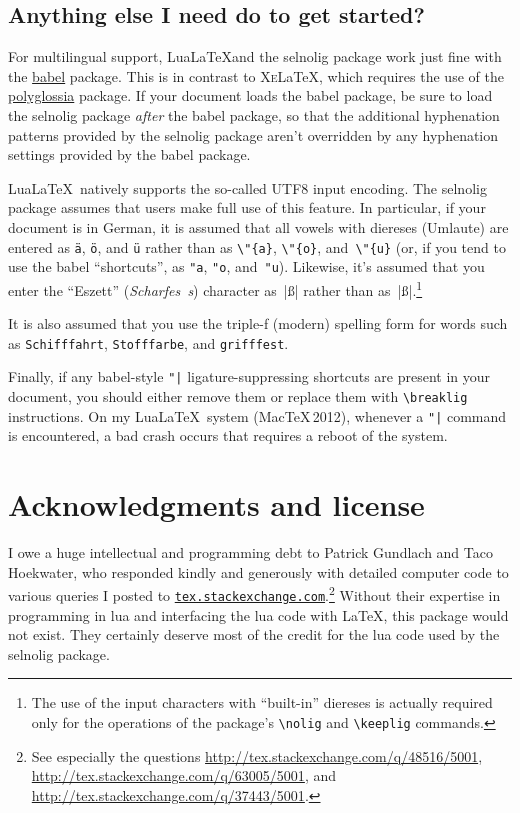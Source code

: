 \documentclass[12pt]{article}
\newcommand{\pkg}[1]{\textsf{#1}}
\newcommand{\cmmd}[1]{\texttt{\textbackslash #1}}
\begin{document}
\subsection{Anything else I need do to get started?} \label{sec:anythingelse}

For multilingual support, Lua\LaTeX and the \pkg{selnolig} package work just fine with the \href{http://www.ctan.org/pkg/babel}{\pkg{babel}} package. This is in contrast to X\textsc{e}\LaTeX, which requires the use of the \href{http://www.ctan.org/pkg/polyglossia}{\pkg{polyglossia}} package. If your document loads the \pkg{babel} package, be sure to load the \pkg{selnolig} package \emph{after} the \pkg{babel} package, so that the additional hyphenation patterns provided by the \pkg{selnolig} package aren't overridden by any hyphenation settings provided by the \pkg{babel} package.

Lua\LaTeX\ natively supports the so-called UTF8 input encoding. The \pkg{selnolig} package assumes that users make full use of this feature. In particular, if your document is in German, it is assumed that all vowels with diereses (Umlaute) are entered as \Verb|ä|, \Verb|ö|, and \Verb|ü| rather than as \Verb|\"{a}|, \Verb|\"{o}|, and~\Verb|\"{u}| (or, if you tend to use the \pkg{babel} \enquote{shortcuts}, as \Verb|"a|, \Verb|"o|, and~\Verb|"u|). Likewise, it's assumed that you enter the \enquote{Eszett} (\emph{Scharfes~s}) character as~|ß| rather than as~|{\ss}|.\footnote{The use of the input characters with \enquote{built-in} diereses is actually required only for the operations of the package's \cmmd{nolig} and \cmmd{keeplig} commands.}

It is also assumed that you use the triple-f (modern) spelling form for words such as \texttt{Schifffahrt}, \texttt{Stofffarbe}, and \texttt{grifffest}.

Finally, if any \pkg{babel}-style \Verb+"|+ ligature-suppressing shortcuts are present in your document, you should either remove them or replace them with \Verb+\breaklig+ instructions. On my Lua\LaTeX\ system (MacTeX\,2012), whenever a \Verb+"|+ command is encountered, a bad crash occurs that requires a reboot of the system.


\section{Acknowledgments and license}

I owe a huge intellectual and programming debt to Patrick Gundlach and Taco Hoekwater, who responded kindly and generously with detailed computer code to various queries I posted to \href{http://tex.stackexchange.com}{\texttt{tex.stackexchange.com}}.\footnote{See especially the questions \url{http://tex.stackexchange.com/q/48516/5001}, \url{http://tex.stackexchange.com/q/63005/5001}, and
\url{http://tex.stackexchange.com/q/37443/5001}.} Without their expertise in programming in lua and interfacing the lua code with \LaTeX, this package would not exist. They certainly deserve most of the credit for the lua code used by the \pkg{selnolig} package.
\end{document}
